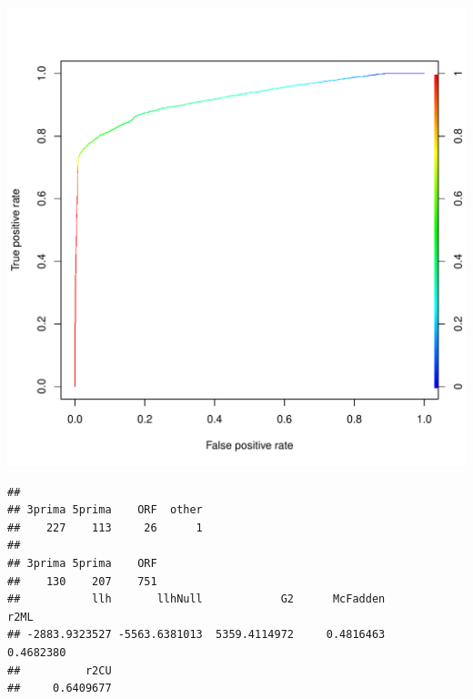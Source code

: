 \documentclass{article}\usepackage[]{graphicx}\usepackage[]{color}
\makeatletter
\def\maxwidth{ %
  \ifdim\Gin@nat@width>\linewidth
    \linewidth
  \else
    \Gin@nat@width
  \fi
}
\newenvironment{kframe}{%
 \def\at@end@of@kframe{}%
 \ifinner\ifhmode%
  \def\at@end@of@kframe{\end{minipage}}%
  \begin{minipage}{\columnwidth}%
 \fi\fi%
 \def\FrameCommand##1{\hskip\@totalleftmargin \hskip-\fboxsep
 \colorbox{shadecolor}{##1}\hskip-\fboxsep
     \hskip-\linewidth \hskip-\@totalleftmargin \hskip\columnwidth}%
 \MakeFramed {\advance\hsize-\width
   \@totalleftmargin\z@ \linewidth\hsize
   \@setminipage}}%
 {\par\unskip\endMakeFramed%
 \at@end@of@kframe}
\newenvironment{knitrout}{}{} %
\makeatother
\begin{document}
\begin{knitrout}
\begin{kframe}
{\ttfamily\noindent\itshape\color{messagecolor}{\#\# The following object is masked from 'package:stats':\\\#\# \\\#\#\ \ \ \  lowess}}\end{kframe}
\includegraphics[width=\maxwidth]{figure/model-1} 
\begin{kframe}\begin{verbatim}
## 
## 3prima 5prima    ORF  other 
##    227    113     26      1
## 
## 3prima 5prima    ORF 
##    130    207    751
##           llh       llhNull            G2      McFadden          r2ML 
## -2883.9323527 -5563.6381013  5359.4114972     0.4816463     0.4682380 
##          r2CU 
##     0.6409677
\end{verbatim}
\end{kframe}
\end{knitrout}
\end{document}
